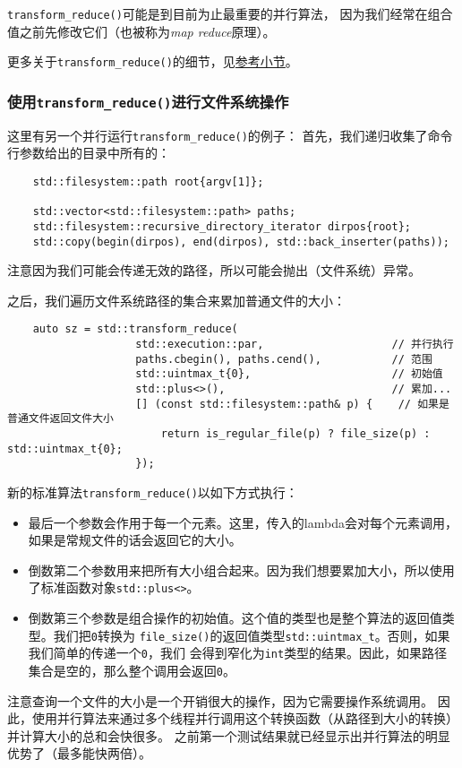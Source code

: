 \texttt{transform\_reduce()}可能是到目前为止最重要的并行算法，
因为我们经常在组合值之前先修改它们（也被称为\emph{map reduce}原理）。

更多关于\texttt{transform\_reduce()}的细节，见\hyperref[ch23.2.2]{参考小节}。

\subsubsection{使用\texttt{transform\_reduce()}进行文件系统操作}\label{ch22.6.1.4}
这里有另一个并行运行\texttt{transform\_reduce()}的例子：
首先，我们递归收集了命令行参数给出的目录中所有的：
\begin{lstlisting}
    std::filesystem::path root{argv[1]};

    std::vector<std::filesystem::path> paths;
    std::filesystem::recursive_directory_iterator dirpos{root};
    std::copy(begin(dirpos), end(dirpos), std::back_inserter(paths));
\end{lstlisting}
注意因为我们可能会传递无效的路径，所以可能会抛出（文件系统）异常。

之后，我们遍历文件系统路径的集合来累加普通文件的大小：
\begin{lstlisting}
    auto sz = std::transform_reduce(
                    std::execution::par,                    // 并行执行
                    paths.cbegin(), paths.cend(),           // 范围
                    std::uintmax_t{0},                      // 初始值
                    std::plus<>(),                          // 累加...
                    [] (const std::filesystem::path& p) {    // 如果是普通文件返回文件大小
                        return is_regular_file(p) ? file_size(p) : std::uintmax_t{0};
                    });
\end{lstlisting}
新的标准算法\texttt{transform\_reduce()}以如下方式执行：
\begin{itemize}
    \item 最后一个参数会作用于每一个元素。这里，传入的lambda会对每个元素调用，
    如果是常规文件的话会返回它的大小。
    \item 倒数第二个参数用来把所有大小组合起来。因为我们想要累加大小，所以使用了标准函数对象\texttt{std::plus<>}。
    \item 倒数第三个参数是组合操作的初始值。这个值的类型也是整个算法的返回值类型。我们把\texttt{0}转换为
    \texttt{file\_size()}的返回值类型\texttt{std::uintmax\_t}。否则，如果我们简单的传递一个\texttt{0}，我们
    会得到窄化为\texttt{int}类型的结果。因此，如果路径集合是空的，那么整个调用会返回\texttt{0}。
\end{itemize}
注意查询一个文件的大小是一个开销很大的操作，因为它需要操作系统调用。
因此，使用并行算法来通过多个线程并行调用这个转换函数（从路径到大小的转换）并计算大小的总和会快很多。
之前第一个测试结果就已经显示出并行算法的明显优势了（最多能快两倍）。

